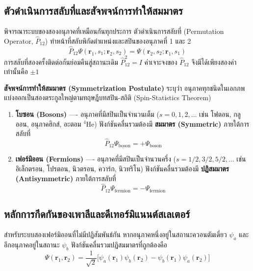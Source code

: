 \subsection{ตัวดำเนินการสลับที่และสัจพจน์การทำให้สมมาตร}
พิจารณาระบบของสองอนุภาคที่เหมือนกันทุกประการ ตัวดำเนินการสลับที่ (Permutation Operator, $\hat{P}_{12}$) ทำหน้าที่สลับพิกัดตำแหน่งและสปินของอนุภาคที่ 1 และ 2
\begin{equation}
\hat{P}_{12} \Psi(\mathbf{r}_1, s_1; \mathbf{r}_2, s_2) = \Psi(\mathbf{r}_2, s_2; \mathbf{r}_1, s_1)
\end{equation}
การสลับที่สองครั้งติดต่อกันย่อมคืนสู่สถานะเดิม $\hat{P}_{12}^2 = I$ ค่าเจาะจงของ $\hat{P}_{12}$ จึงมีได้เพียงสองค่าเท่านั้นคือ $\pm 1$

\textbf{สัจพจน์การทำให้สมมาตร (Symmetrization Postulate)} ระบุว่า อนุภาคทุกชนิดในเอกภพแบ่งออกเป็นสองตระกูลใหญ่ตามทฤษฎีบทสปิน-สถิติ (Spin-Statistics Theorem)
\begin{enumerate}
    \item \textbf{โบซอน (Bosons)} ---- อนุภาคที่มีสปินเป็นจำนวนเต็ม ($s = 0, 1, 2, \dots$ เช่น โฟตอน, กลูออน, อนุภาคฮิกส์, อะตอม $^4\text{He}$) ฟังก์ชันคลื่นรวมต้องมี \textbf{สมมาตร (Symmetric)} ภายใต้การสลับที่
    \begin{equation}
    \hat{P}_{12} \Psi_{\text{boson}} = +\Psi_{\text{boson}}
    \end{equation}
    \item \textbf{เฟอร์มิออน (Fermions)} ---- อนุภาคที่มีสปินเป็นจำนวนครึ่ง ($s = 1/2, 3/2, 5/2, \dots$ เช่น อิเล็กตรอน, โปรตอน, นิวตรอน, ควาร์ก, นิวทริโน) ฟังก์ชันคลื่นรวมต้องมี \textbf{ปฏิสมมาตร (Antisymmetric)} ภายใต้การสลับที่
    \begin{equation}
    \hat{P}_{12} \Psi_{\text{fermion}} = -\Psi_{\text{fermion}}
    \end{equation}
\end{enumerate}

\subsection{หลักการกีดกันของเพาลีและดีเทอร์มิแนนต์สเลเตอร์}
สำหรับระบบสองเฟอร์มิออนที่ไม่มีปฏิสัมพันธ์กัน หากอนุภาคหนึ่งอยู่ในสถานะควอนตัมเดี่ยว $\psi_a$ และอีกอนุภาคอยู่ในสถานะ $\psi_b$ ฟังก์ชันคลื่นรวมปฏิสมมาตรที่ถูกต้องคือ
\begin{equation}
\Psi(\mathbf{r}_1, \mathbf{r}_2) = \frac{1}{\sqrt{2}} \Big[ \psi_a(\mathbf{r}_1)\psi_b(\mathbf{r}_2) - \psi_b(\mathbf{r}_1)\psi_a(\mathbf{r}_2) \Big]
\label{eq:two_fermion_state}
\end{equation}

